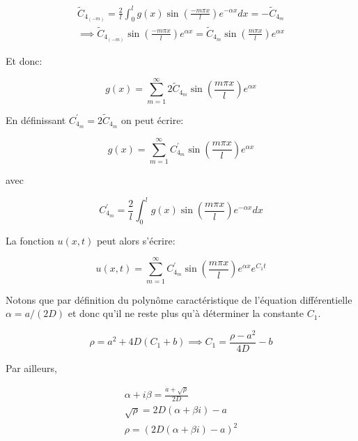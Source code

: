 \documentclass[a4paper, 12pt]{report}
\begin{document}
\begin{align}
  \tilde{C}_{4_{(-m)}} = \frac{2}{l} \int_0^l g(x) \sin \left (\frac{-m \pi x}{l} \right ) e^{-\alpha x} dx = -\tilde{C}_{4_m}\\
  \implies \tilde{C}_{4_{(-m)}} \sin \left (\frac{-m \pi x}{l} \right ) e^{\alpha x} = \tilde{C}_{4_m} \sin \left (\frac{m \pi x}{l} \right ) e^{\alpha x}
\end{align}

Et donc:

\begin{equation}
  g(x) = \sum_{m=1}^{\infty} 2 \tilde{C}_{4_m} \sin \left (\frac{m \pi x}{l} \right ) e^{\alpha x}
\end{equation}

En définissant $C^'_{4_m} = 2 \tilde{C}_{4_m}$ on peut écrire:

\begin{equation}
  g(x) = \sum_{m=1}^{\infty} C^'_{4_m} \sin \left (\frac{m \pi x}{l} \right ) e^{\alpha x}
\end{equation}

avec

\begin{equation}
  C^'_{4_m} =  \frac{2}{l} \int_0^l g(x) \sin \left (\frac{m \pi x}{l} \right ) e^{-\alpha x} dx
\end{equation}

La fonction $u(x,t)$ peut alors s'écrire:

\begin{equation}
u(x,t) = \sum_{m=1}^{\infty} C^'_{4_m} \sin \left (\frac{m \pi x}{l} \right ) e^{\alpha x} e^{C_1 t}
\end{equation}

Notons que par définition du polynôme caractéristique de l'équation différentielle
$\alpha = a/(2D)$ et donc qu'il ne reste plus qu'à déterminer la constante $C_1$.

\begin{equation}
  \rho = a^2 + 4D (C_1 +b) \implies \boxed{C_1 = \frac{\rho-a^2}{4D}-b}
\end{equation}

Par ailleurs,

\begin{align}
  \alpha + i \beta = \frac{a + \sqrt{\rho}}{2D}\\
  \sqrt{\rho} = 2D (\alpha + \beta i) - a\\
  \rho = \left ( 2D (\alpha + \beta i) - a \right )^2
\end{align}
\end{document}
